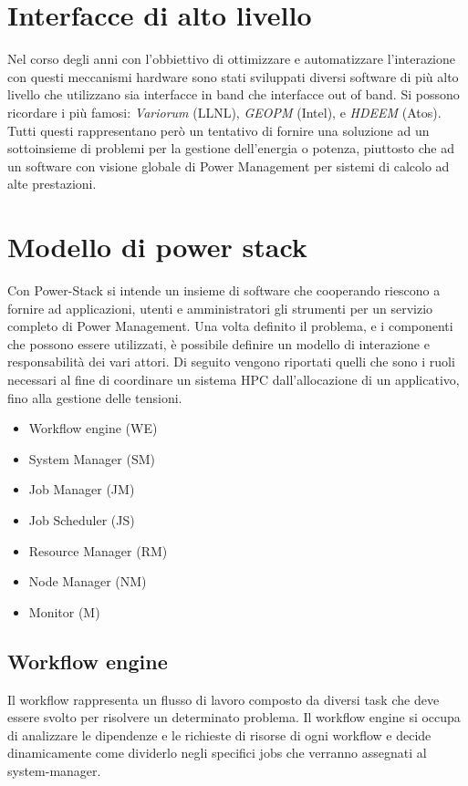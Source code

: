 \section{Interfacce di alto livello}
Nel corso degli anni con l'obbiettivo di ottimizzare e automatizzare l'interazione con questi meccanismi hardware sono stati sviluppati diversi software di più alto livello che utilizzano sia interfacce in band che interfacce out of band. Si possono ricordare i più famosi: \emph{Variorum} (LLNL), \emph{GEOPM} (Intel)\cite{GEOPM}, e \emph{HDEEM} (Atos)\cite{HDEEM}. Tutti questi rappresentano però un tentativo di fornire una soluzione ad un sottoinsieme di problemi per la gestione dell'energia o potenza, piuttosto che ad un software con visione globale di Power Management per sistemi di calcolo ad alte prestazioni. %


\section{Modello di power stack} %
Con Power-Stack si intende un insieme di software che cooperando riescono a fornire ad applicazioni, utenti e amministratori gli strumenti per un servizio completo di Power Management. Una volta definito il problema, e i componenti che possono essere utilizzati, è possibile definire un modello di interazione e responsabilità dei vari attori. Di seguito vengono riportati quelli che sono i ruoli necessari al fine di coordinare un sistema HPC dall'allocazione di un applicativo, fino alla gestione delle tensioni. 
\begin{itemize}
    \item Workflow engine (WE)
    \item System Manager (SM)
    \item Job Manager (JM)
    \item Job Scheduler (JS)
    \item Resource Manager (RM)
    \item Node Manager (NM)
    \item Monitor (M)
\end{itemize}

\subsection{Workflow engine}
Il workflow rappresenta un flusso di lavoro composto da diversi task che deve essere svolto per risolvere un determinato problema. Il workflow engine si occupa di analizzare le dipendenze e le richieste di risorse di ogni workflow e decide dinamicamente come dividerlo negli specifici jobs che verranno assegnati al system-manager. %

